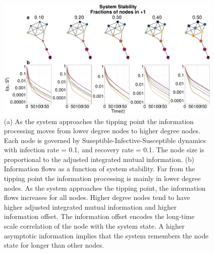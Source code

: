\documentclass[a4paper, 11pt, twocolumn]{article}
\begin{document}
\begin{figure}
\centering
\includegraphics[width=.9\linewidth]{./figures/sis_kite_graph.pdf}
\caption{\label{fig:kite_res_sis}(a) As the system approaches the tipping point the information processing moves from lower degree  nodes to higher degree nodes. Each node is governed by Suseptible-Infective-Susceptible dynamics with infection rate = 0.1, and recovery rate = 0.1. The node size is proportional to the adjusted integrated mutual information. (b) Information flows as a function of system stability. Far from the tipping point the information processing is mainly in lower degree nodes. As the system approaches the tipping point, the information flows increases for all nodes. Higher degree nodes tend to have higher adjusted integrated mutual information and higher information offset. The information offset encodes the long-time scale correlation of the node with the system state. A higher asymptotic information implies that the system remembers the node state for longer than other nodes.}
\end{figure}
\end{document}
